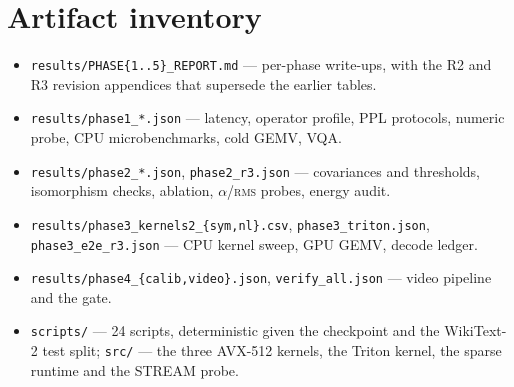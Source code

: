 \documentclass[11pt]{article}
\newcommand{\code}[1]{\texttt{\small #1}}
\newcommand{\rms}{\textsc{rms}}
\begin{document}
\section{Artifact inventory}
\begin{itemize}\raggedright
\item \code{results/PHASE\{1..5\}\_REPORT.md} --- per-phase write-ups, with the R2 and R3
revision appendices that supersede the earlier tables.
\item \code{results/phase1\_*.json} --- latency, operator profile, PPL protocols, numeric
probe, CPU microbenchmarks, cold GEMV, VQA.
\item \code{results/phase2\_*.json}, \code{phase2\_r3.json} --- covariances and thresholds,
isomorphism checks, ablation, $\alpha$/\rms{} probes, energy audit.
\item \code{results/phase3\_kernels2\_\{sym,nl\}.csv}, \code{phase3\_triton.json},
\code{phase3\_e2e\_r3.json} --- CPU kernel sweep, GPU GEMV, decode ledger.
\item \code{results/phase4\_\{calib,video\}.json}, \code{verify\_all.json} --- video
pipeline and the gate.
\item \code{scripts/} --- 24 scripts, deterministic given the checkpoint and the WikiText-2
test split; \code{src/} --- the three AVX-512 kernels, the Triton kernel, the sparse
runtime and the STREAM probe.
\end{itemize}
\end{document}
